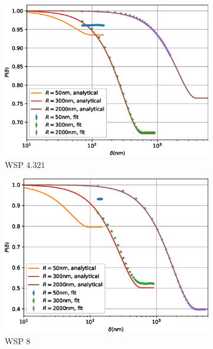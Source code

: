 \documentclass{article}
\begin{document}
\begin{figure}[p]
\begin{subfigure}[b]{0.45\textwidth}
		\includegraphics[width=\textwidth]{simulation-plot-gauss-WSP-4.321}
		\caption{WSP 4.321}
		\label{fig:simulation-plot-gauss-WSP-4.321}
	\end{subfigure}
	\hfill
	\begin{subfigure}[b]{0.45\textwidth}
		\centering
		\includegraphics[width=\textwidth]{simulation-plot-gauss-WSP-8}
		\caption{WSP 8}
		\label{fig:simulation-plot-gauss-WSP-8}
	\end{subfigure}
	\centering
	\begin{subfigure}[b]{0.45\textwidth}
		\centering

\end{subfigure}
\end{figure}
\end{document}
